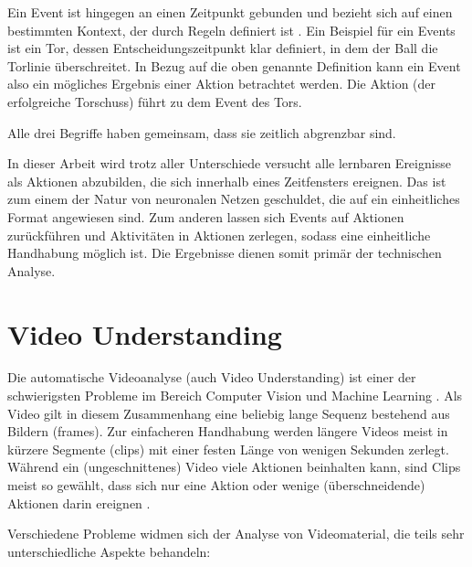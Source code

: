 Ein Event ist hingegen an einen Zeitpunkt gebunden und bezieht sich auf einen bestimmten Kontext, der durch Regeln definiert ist \cite{Giancola18}.
Ein Beispiel für ein Events ist \ua ein Tor, dessen Entscheidungszeitpunkt klar definiert, in dem der Ball die Torlinie überschreitet.
In Bezug auf die oben genannte Definition kann ein Event also ein mögliches Ergebnis einer Aktion betrachtet werden.
Die Aktion (der erfolgreiche Torschuss) führt zu dem Event des Tors.

Alle drei Begriffe haben gemeinsam, dass sie zeitlich abgrenzbar sind.

In dieser Arbeit wird trotz aller Unterschiede versucht alle lernbaren Ereignisse als Aktionen abzubilden, die sich innerhalb eines Zeitfensters ereignen.
Das ist zum einem der Natur von neuronalen Netzen geschuldet, die auf ein einheitliches Format angewiesen sind.
Zum anderen lassen sich Events auf Aktionen zurückführen und Aktivitäten in Aktionen zerlegen, sodass eine einheitliche Handhabung möglich ist.
Die Ergebnisse dienen somit primär der technischen Analyse.


\section{Video Understanding}
\label{sec:video-understanding}

Die automatische Videoanalyse (auch Video Understanding) ist einer der schwierigsten Probleme im Bereich Computer Vision und Machine Learning \cite{Sozykin17} \cite{Jiang19}.
Als Video gilt in diesem Zusammenhang eine beliebig lange Sequenz bestehend aus Bildern (\gls{frames}).
Zur einfacheren Handhabung werden längere Videos meist in kürzere Segmente (\gls{clips}) mit einer festen Länge von wenigen Sekunden zerlegt.
Während ein (ungeschnittenes) Video viele Aktionen beinhalten kann, sind Clips meist so gewählt, dass sich nur eine Aktion oder wenige (überschneidende) Aktionen darin ereignen \cite{Jiang19} \cite{Kay17}.

Verschiedene Probleme widmen sich der Analyse von Videomaterial, die teils sehr unterschiedliche Aspekte behandeln:

